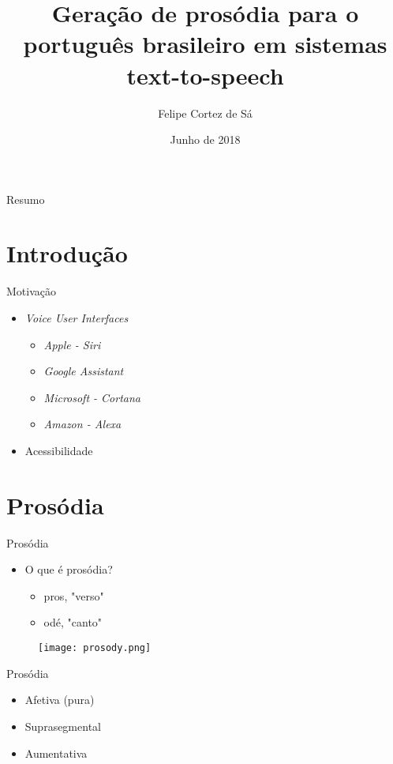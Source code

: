 \documentclass{beamer}
\title[Geração de prosódia]{Geração de prosódia para o português brasileiro em sistemas text-to-speech}
\author{Felipe Cortez de Sá}
\date{Junho de 2018}
\institute[UFRN]{Universidade Federal do Rio Grande do Norte}
\begin{document}
\begin{frame}
  \titlepage
\end{frame}

\begin{frame}{Resumo}
  \tableofcontents
\end{frame}

\section{Introdução}
\begin{frame}{Motivação}
  \begin{itemize}
    \item \emph{Voice User Interfaces}
        \begin{itemize}
            \item \emph{Apple - Siri}
            \item \emph{Google Assistant}
            \item \emph{Microsoft - Cortana}
            \item \emph{Amazon - Alexa}
        \end{itemize}
    \item Acessibilidade
  \end{itemize}
\end{frame}

\section{Prosódia}
\begin{frame}{Prosódia}
  \begin{itemize}
    \item O que é prosódia?
        \begin{itemize}
            \item pros, "verso"
            \item odé,  "canto"
        \end{itemize}
  \end{itemize}
  \pause
    \begin{figure}
      \texttt{[image: prosody.png]}
    \end{figure}
\end{frame}

\begin{frame}{Prosódia}
  \begin{itemize}
    \item Afetiva (pura)
    \item Suprasegmental
    \item Aumentativa
  \end{itemize}
\end{frame}
\end{document}
